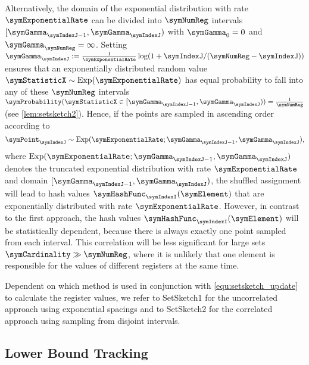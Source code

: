 \documentclass[sigconf, nonacm]{acmart}
\newif\ifextended\extendedtrue
\DeclareMathOperator*{\symExponential}{Exp}
\begin{document}
Alternatively, the domain of the exponential distribution with rate $\symExponentialRate$ can be divided into $\symNumReg$ intervals $[\symGamma_{\symIndexJ-1},\symGamma_{\symIndexJ})$ with $\symGamma_0=0$ and $\symGamma_\symNumReg=\infty$. Setting $\symGamma_\symIndexJ:=\frac{1}{\symExponentialRate}\log(1 + \symIndexJ/(\symNumReg-\symIndexJ))$ ensures that 
an exponentially distributed random value $\symStatisticX\sim\symExponential(\symExponentialRate)$ has equal probability to fall into any of these $\symNumReg$ intervals $\symProbability(\symStatisticX\in[\symGamma_{\symIndexJ-1},\symGamma_{\symIndexJ})) = \frac{1}{\symNumReg}$ \ifextended(see \cref{lem:setsketch2})\else\cite{Ertl2021}\fi.
Hence, if the points are sampled in ascending order according to 
\begin{equation}
\label{equ:correlated}
\symPoint_\symIndexJ \sim
\symExponential(\symExponentialRate; \symGamma_{\symIndexJ-1},\symGamma_{\symIndexJ})
,
\end{equation}
where $\symExponential(\symExponentialRate; \symGamma_{\symIndexJ-1},\symGamma_{\symIndexJ})$ denotes the truncated exponential distribution with rate $\symExponentialRate$ and domain $[\symGamma_{\symIndexJ-1},\symGamma_{\symIndexJ})$, the shuffled assignment will lead to hash values $\symHashFunc_\symIndexI(\symElement)$ that are exponentially distributed with rate $\symExponentialRate$. However, in contrast to the first approach, the hash values $\symHashFunc_\symIndexI(\symElement)$ will be statistically dependent, because there is always exactly one point sampled from each interval. This correlation will be less significant for large sets $\symCardinality \gg \symNumReg$, where it is unlikely that one element is responsible for the values of different registers at the same time.

Dependent on which method is used in conjunction with \eqref{equ:setsketch_update} to calculate the register values, we refer to SetSketch1 for the uncorrelated approach using exponential spacings and to SetSketch2 for the correlated approach using sampling from disjoint intervals.


\subsection{Lower Bound Tracking}
\label{sec:lower_bound_tracking}
\end{document}
